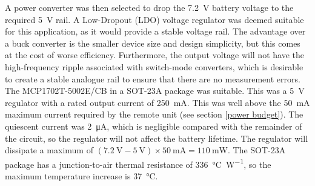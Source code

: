 
A power converter was then selected to drop the \SI{7.2}{\volt} battery voltage to the required \SI{5}{\volt} rail. A Low-Dropout (LDO) voltage regulator was deemed suitable for this application, as it would provide a stable voltage rail. The advantage over a buck converter is the smaller device size and design simplicity, but this comes at the cost of worse efficiency. Furthermore, the output voltage will not have the high-frequency ripple associated with switch-mode converters, which is desirable to create a stable analogue rail to ensure that there are no measurement errors. The MCP1702T-5002E/CB \cite{mcp1702} in a SOT-23A package was suitable. This was a \SI{5}{\volt} regulator with a rated output current of \SI{250}{\milli\ampere}. This was well above the \SI{50}{\milli\ampere} maximum current required by the remote unit (see section \ref{power budget}). The quiescent current was \SI{2}{\micro\ampere}, which is negligible compared with the remainder of the circuit, so the regulator will not affect the battery lifetime. The regulator will dissipate a maximum of $(\SI{7.2}{\volt}-\SI{5}{\volt})\times\SI{50}{\milli\ampere}=\SI{110}{\milli\watt}$. The SOT-23A package has a junction-to-air thermal resistance of \SI{336}{\celsius\per\watt}, so the maximum temperature increase is \SI{37}{\celsius}.\\	

